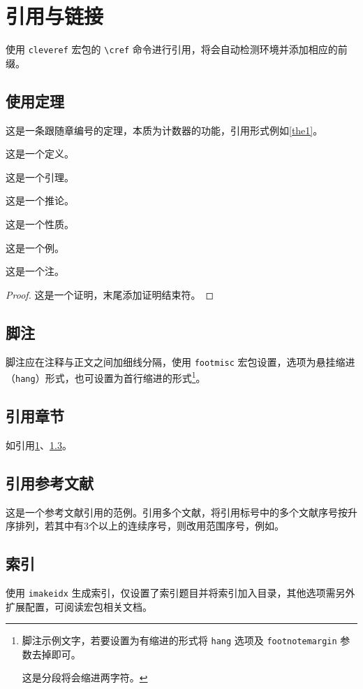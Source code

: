 
\chapter{引用与链接}\label{chap1}
使用 \lstinline{cleveref} 宏包的 \lstinline{\cref} 命令进行引用，将会自动检测环境并添加相应的前缀。

\section{使用定理}
\begin{theorem}[（这是中文括号副标题）]\label{the1}
	这是一条跟随\textsf{章}编号的定理，本质为计数器的功能，引用形式例如\cref{the1}。
\end{theorem}
\begin{definition}
	这是一个定义。
\end{definition}
\begin{lemma}
	这是一个引理。
\end{lemma}
\begin{corollary}
	这是一个推论。
\end{corollary}
\begin{proposition}
	这是一个性质。
\end{proposition}
\begin{example}
	这是一个例。
\end{example}
\begin{remark}
	这是一个注。
\end{remark}
\begin{proof}\pushQED{\qed}
	这是一个证明，末尾添加证明结束符。\popQED
\end{proof}

\section{脚注}
脚注应在注释与正文之间加细线分隔，使用 \lstinline{footmisc} 宏包设置，选项为悬挂缩进（\lstinline{hang}）形式，也可设置为首行缩进的形式\footnote{脚注示例文字，若要设置为有缩进的形式将 \lstinline{hang} 选项及 \lstinline{footnotemargin} 参数去掉即可。\par 这是分段将会缩进两字符。}。

\section{引用章节}\label{sec1}
如引用\cref{chap1}、\cref{sec1}。

\section{引用参考文献}
这是一个参考文献引用的范例\cite{1979Prospect}。引用多个文献，将引用标号中的多个文献序号按升序排列，若其中有3个以上的连续序号，则改用范围序号，例如\cite{1979Prospect,2004Text,1979Intracellular}。

\section{索引}
使用 \lstinline{imakeidx} 生成索引，仅设置了索引题目并将索引加入目录，其他选项需另外扩展配置，可阅读宏包相关文档。